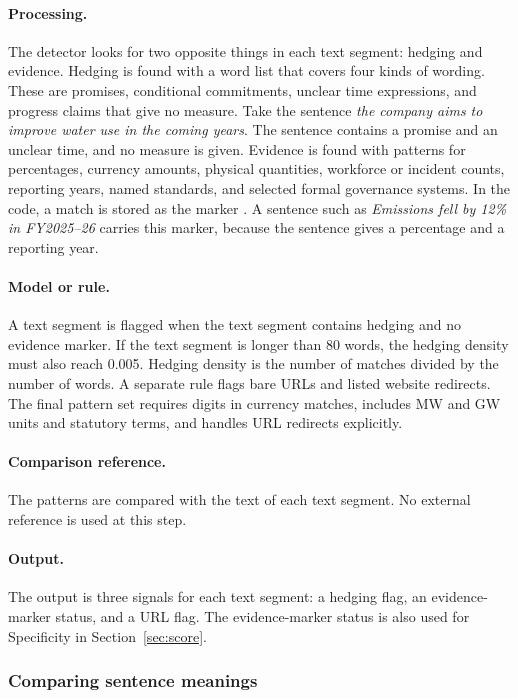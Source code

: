 \paragraph{Processing.} The detector looks for two opposite things in each text segment: hedging and evidence. Hedging is found with a word list that covers four kinds of wording. These are promises, conditional commitments, unclear time expressions, and progress claims that give no measure. Take the sentence \emph{the company aims to improve water use in the coming years}. The sentence contains a promise and an unclear time, and no measure is given. Evidence is found with patterns for percentages, currency amounts, physical quantities, workforce or incident counts, reporting years, named standards, and selected formal governance systems. In the code, a match is stored as the marker . A sentence such as \emph{Emissions fell by 12\% in FY2025--26} carries this marker, because the sentence gives a percentage and a reporting year.

\paragraph{Model or rule.} A text segment is flagged when the text segment contains hedging and no evidence marker. If the text segment is longer than 80 words, the hedging density must also reach 0.005. Hedging density is the number of matches divided by the number of words. A separate rule flags bare URLs and listed website redirects. The final pattern set requires digits in currency matches, includes MW and GW units and statutory terms, and handles URL redirects explicitly.

\paragraph{Comparison reference.} The patterns are compared with the text of each text segment. No external reference is used at this step.

\paragraph{Output.} The output is three signals for each text segment: a hedging flag, an evidence-marker status, and a URL flag. The evidence-marker status is also used for Specificity in Section~\ref{sec:score}.

\subsubsection{Comparing sentence meanings}

